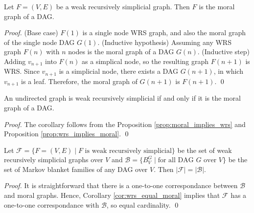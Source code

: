 \begin{proposition}
\label{prop:wrs_implies_moral}
Let $F=(V,E)$ be a weak recursively simplicial graph. Then $F$ is the moral graph of a DAG. 
\end{proposition}

\begin{proof}
(Base case) $F(1)$ is a single node WRS graph, and also the moral graph of the single node DAG $G(1)$. (Inductive hypothesis) Assuming any WRS graph $F(n)$ with $n$ nodes is the moral graph of a DAG $G(n)$. (Inductive step) Adding $v_{n+1}$ into $F(n)$ as a simplical node, so the resulting graph $F(n+1)$ is WRS. Since $v_{n+1}$ is a simplicial node, there exists a DAG $G(n+1)$, in which $v_{n+1}$ is a leaf. Therefore, the moral graph of $G(n+1)$ is $F(n+1)$. \qed

\end{proof}

\begin{corollary}
\label{cor:wrs_equal_moral}
An undirected graph is weak recursively simplicial if and only if it is the moral graph of a DAG. 
\end{corollary}
\begin{proof}
The corollary follows from the Proposition \ref{prop:moral_implies_wrs} and Proposition \ref{prop:wrs_implies_moral}. \qed
\end{proof}

\begin{corollary}
Let $\mathcal{F}=\{F=(V,E) \mid F \text{ is weak recursively simplicial}\}$ be the set of weak recursively simplicial graphs over $V$ and $\mathcal{B} = \{B_V^G \mid \text{for all DAG $G$ over $V$}\}$ be the set of Markov blanket families of any DAG over $V$. Then $|\mathcal{F}| = |\mathcal{B}|$. 
\end{corollary}
\begin{proof}
It is straightforward that there is a one-to-one correspondance between $\mathcal{B}$ and moral graphs. Hence, Corollary \ref{cor:wrs_equal_moral} implies that $\mathcal{F}$ has a one-to-one correspondance with $\mathcal{B}$, so equal cardinality. \qed
\end{proof}

